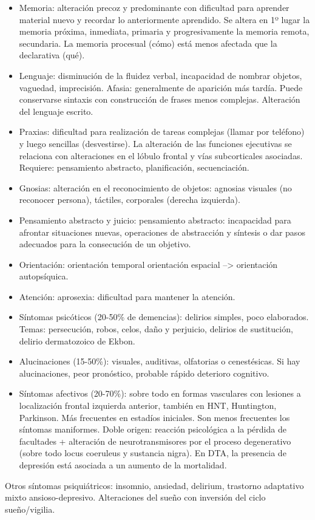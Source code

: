 \documentclass[encares.tex]{subfiles}
\begin{document}
\begin{itemize}
\item Memoria: alteración precoz y predominante con dificultad para aprender material nuevo y recordar lo anteriormente aprendido. Se altera en 1º lugar la memoria próxima, inmediata, primaria y progresivamente la memoria remota, secundaria. La memoria procesual (cómo) está menos afectada que la declarativa (qué).
\item Lenguaje: disminución de la fluidez verbal, incapacidad de nombrar objetos, vaguedad, imprecisión. Afasia: generalmente de aparición más tardía. Puede conservarse sintaxis con construcción de frases menos complejas. Alteración del lenguaje escrito.
\item Praxias: dificultad para realización de tareas complejas (llamar por teléfono) y luego sencillas (desvestirse). La alteración de las funciones ejecutivas se relaciona con alteraciones en el lóbulo frontal y vías subcorticales asociadas. Requiere: pensamiento abstracto, planificación, secuenciación.
\item Gnosias: alteración en el reconocimiento de objetos: agnosias visuales (no reconocer persona), táctiles, corporales (derecha izquierda).
\item Pensamiento abstracto y juicio: pensamiento abstracto: incapacidad para afrontar situaciones nuevas, operaciones de abstracción y síntesis o dar pasos adecuados para la consecución de un objetivo.
\item Orientación: orientación temporal orientación espacial –> orientación autopsíquica.
\item Atención: aprosexia: dificultad para mantener la atención.
\item Síntomas psicóticos (20-50\% de demencias): delirios simples, poco elaborados. Temas: persecución, robos, celos, daño y perjuicio, delirios de sustitución, delirio dermatozoico de Ekbon.
\item Alucinaciones (15-50\%): visuales, auditivas, olfatorias o cenestésicas. Si hay alucinaciones, peor pronóstico, probable rápido deterioro cognitivo.
\item Síntomas afectivos (20-70\%): sobre todo en formas vasculares con lesiones a localización frontal izquierda anterior, también en HNT, Huntington, Parkinson. Más frecuentes en estadíos iniciales. Son menos frecuentes los síntomas maniformes. Doble origen: reacción psicológica a la pérdida de facultades + alteración de neurotransmisores por el proceso degenerativo (sobre todo locus coeruleus y sustancia nigra). En DTA, la presencia de depresión está asociada a un aumento de la mortalidad.
\end{itemize}
Otros síntomas psiquiátricos: insomnio, ansiedad, delirium, trastorno adaptativo mixto ansioso-depresivo. Alteraciones del sueño con inversión del ciclo sueño/vigilia.
\end{document}
